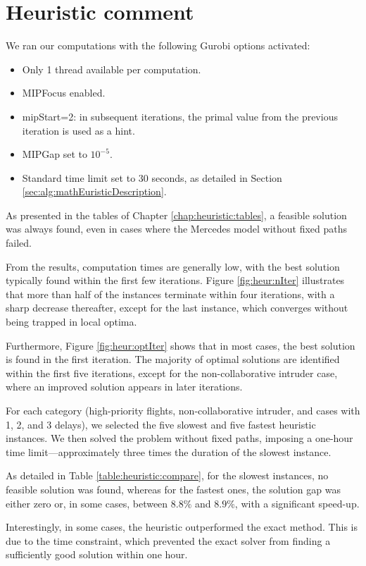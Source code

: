 \documentclass[../../thesis.tex]{subfiles}
\begin{document}
\section{Heuristic comment}

We ran our computations with the following Gurobi options activated:
\begin{itemize}
    \item Only 1 thread available per computation.
    \item MIPFocus enabled.
    \item mipStart=2: in subsequent iterations, the primal value from the previous iteration is used as a hint.
    \item MIPGap set to $10^{-5}$.
    \item Standard time limit set to $30$ seconds, as detailed in Section \ref{sec:alg:mathEuristicDescription}.
\end{itemize}

As presented in the tables of Chapter \ref{chap:heuristic:tables}, a feasible solution was always found, even in cases where the Mercedes model without fixed paths failed.

From the results, computation times are generally low, with the best solution typically found within the first few iterations. Figure \ref{fig:heur:nIter} illustrates that more than half of the instances terminate within four iterations, with a sharp decrease thereafter, except for the last instance, which converges without being trapped in local optima.

Furthermore, Figure \ref{fig:heur:optIter} shows that in most cases, the best solution is found in the first iteration. The majority of optimal solutions are identified within the first five iterations, except for the non-collaborative intruder case, where an improved solution appears in later iterations.

For each category (high-priority flights, non-collaborative intruder, and cases with 1, 2, and 3 delays), we selected the five slowest and five fastest heuristic instances. We then solved the problem without fixed paths, imposing a one-hour time limit—approximately three times the duration of the slowest instance.

As detailed in Table \ref{table:heuristic:compare}, for the slowest instances, no feasible solution was found, whereas for the fastest ones, the solution gap was either zero or, in some cases, between $8.8\%$ and $8.9\%$, with a significant speed-up.

Interestingly, in some cases, the heuristic outperformed the exact method. This is due to the time constraint, which prevented the exact solver from finding a sufficiently good solution within one hour.
\end{document}
